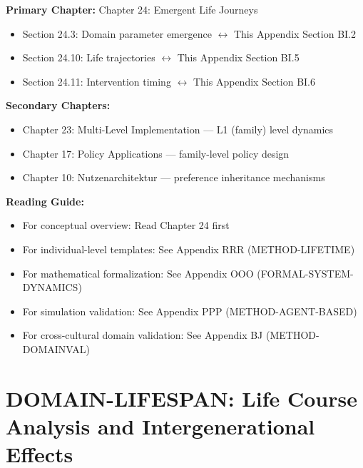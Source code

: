 
\begin{tcolorbox}[colback=purple!5!white, colframe=purple!75!black,
    title=Chapter Linkage]

\textbf{Primary Chapter:} Chapter 24: Emergent Life Journeys
\begin{itemize}[nosep]
\item Section 24.3: Domain parameter emergence $\leftrightarrow$ This Appendix Section BI.2
\item Section 24.10: Life trajectories $\leftrightarrow$ This Appendix Section BI.5
\item Section 24.11: Intervention timing $\leftrightarrow$ This Appendix Section BI.6
\end{itemize}

\textbf{Secondary Chapters:}
\begin{itemize}[nosep]
\item Chapter 23: Multi-Level Implementation --- L1 (family) level dynamics
\item Chapter 17: Policy Applications --- family-level policy design
\item Chapter 10: Nutzenarchitektur --- preference inheritance mechanisms
\end{itemize}

\textbf{Reading Guide:}
\begin{itemize}[nosep]
\item For conceptual overview: Read Chapter 24 first
\item For individual-level templates: See Appendix RRR (METHOD-LIFETIME)
\item For mathematical formalization: See Appendix OOO (FORMAL-SYSTEM-DYNAMICS)
\item For simulation validation: See Appendix PPP (METHOD-AGENT-BASED)
\item For cross-cultural domain validation: See Appendix BJ (METHOD-DOMAINVAL)
\end{itemize}

\end{tcolorbox}


\chapter{DOMAIN-LIFESPAN: Life Course Analysis and Intergenerational Effects}
\label{app:lifespan}


